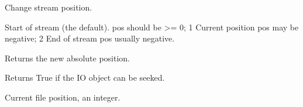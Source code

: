 \documentclass[letterpaper,10pt,english]{sphinxmanual}
\begin{document}
\begin{fulllineitems}
\begin{fulllineitems}
\label{\detokenize{modules/src.pig_sorting_api.main:src.pig_sorting_api.main.BytesIO.seek}}
\pysigstartsignatures
\pysiglinewithargsret
{}
{\sphinxparamcomma {}\sphinxparamcomma {}}
{}
\pysigstopsignatures
\sphinxAtStartPar
Change stream position.
\begin{description}
  Start of stream (the default).  pos should be \textgreater{}= 0;
1  Current position \sphinxhyphen{} pos may be negative;
2  End of stream \sphinxhyphen{} pos usually negative.

\end{description}

\sphinxAtStartPar
Returns the new absolute position.

\end{fulllineitems}


\begin{fulllineitems}
\label{\detokenize{modules/src.pig_sorting_api.main:src.pig_sorting_api.main.BytesIO.seekable}}
\pysigstartsignatures
\pysiglinewithargsret
{}
{}
{}
\pysigstopsignatures
\sphinxAtStartPar
Returns True if the IO object can be seeked.

\end{fulllineitems}


\begin{fulllineitems}
\label{\detokenize{modules/src.pig_sorting_api.main:src.pig_sorting_api.main.BytesIO.tell}}
\pysigstartsignatures
\pysiglinewithargsret
{}
{}
{}
\pysigstopsignatures
\sphinxAtStartPar
Current file position, an integer.

\end{fulllineitems}



\end{fulllineitems}
\end{document}
